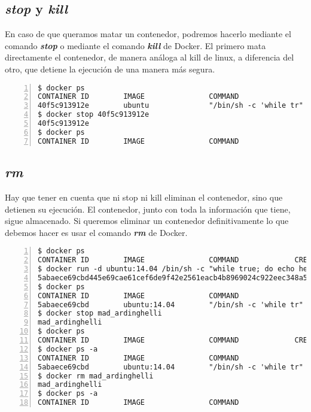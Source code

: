 	\subsection{\textit{stop} y \textit{kill}}
	En caso de que queramos matar un contenedor, podremos hacerlo mediante el comando \textbf{\emph{stop}} o mediante el comando \textbf{\emph{kill}} de Docker. El primero mata directamente el contenedor, de manera análoga al kill de linux, a diferencia del otro, que detiene la ejecución de una manera más segura.
	
	\begin{lstlisting}[style=consola,numbers=left]
$ docker ps
CONTAINER ID        IMAGE               COMMAND                  CREATED             STATUS              PORTS               NAMES
40f5c913912e        ubuntu              "/bin/sh -c 'while tr"   2 seconds ago       Up 2 seconds                            adoring_euclid
$ docker stop 40f5c913912e
40f5c913912e
$ docker ps
CONTAINER ID        IMAGE               COMMAND                  CREATED             STATUS              PORTS               NAMES

	\end{lstlisting}
	
	\subsection{\textit{rm}}
	Hay que tener en cuenta que ni stop ni kill eliminan el contenedor, sino que detienen su ejecución. El contenedor, junto con toda la información que tiene, sigue almacenado. Si queremos eliminar un contenedor definitivamente lo que debemos hacer es usar el comando \textbf{\emph{rm}} de Docker.
	
	\begin{lstlisting}[style=consola,numbers=left]
$ docker ps
CONTAINER ID        IMAGE               COMMAND             CREATED             STATUS              PORTS               NAMES
$ docker run -d ubuntu:14.04 /bin/sh -c "while true; do echo hello world; sleep 1; done"
5abaece69cbd445e69cae61cef6de9f42e2561eacb4b8969024c922eec348a5d
$ docker ps
CONTAINER ID        IMAGE               COMMAND                  CREATED             STATUS              PORTS               NAMES
5abaece69cbd        ubuntu:14.04        "/bin/sh -c 'while tr"   3 seconds ago       Up 2 seconds                            mad_ardinghelli
$ docker stop mad_ardinghelli
mad_ardinghelli
$ docker ps
CONTAINER ID        IMAGE               COMMAND             CREATED             STATUS              PORTS               NAMES
$ docker ps -a
CONTAINER ID        IMAGE               COMMAND                  CREATED             STATUS                       PORTS               NAMES
5abaece69cbd        ubuntu:14.04        "/bin/sh -c 'while tr"   5 minutes ago       Exited (137) 4 minutes ago                       mad_ardinghelli
$ docker rm mad_ardinghelli
mad_ardinghelli
$ docker ps -a
CONTAINER ID        IMAGE               COMMAND                  CREATED             STATUS                       PORTS               NAMES
	\end{lstlisting}	
	
